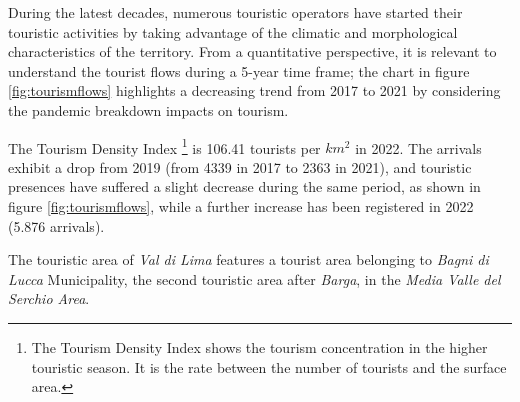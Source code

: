 \documentclass[sustainability,article,submit,pdftex,moreauthors]{Definitions/mdpi}
\begin{document}
During the latest decades, numerous touristic operators have started their touristic activities by taking advantage of the climatic and morphological characteristics of the territory. From a quantitative perspective, it is relevant to understand the tourist flows during a 5-year time frame; the chart in figure \ref{fig:tourismflows} highlights a decreasing trend from 2017 to 2021 by considering the pandemic breakdown impacts on tourism.


The Tourism Density Index \footnote{The Tourism Density Index shows the tourism concentration in the higher touristic season. It is the rate between the number of tourists and the surface area.} is 106.41 tourists per $km^2$ in 2022. The arrivals exhibit a drop from 2019 (from  4339 in 2017 to 2363 in 2021), and touristic presences have suffered a slight decrease during the same period, as shown in figure \ref{fig:tourismflows}, while a further increase has been registered in 2022 (5.876 arrivals).

The touristic area of \emph{Val di Lima} features a tourist area belonging to \emph{Bagni di Lucca} Municipality, the second touristic area after \textit{Barga}, in the \textit{Media Valle del Serchio Area}.


\end{document}
